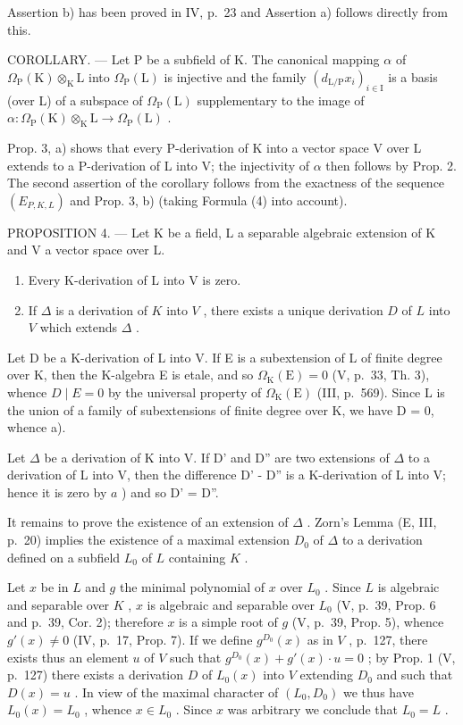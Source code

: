 Assertion b) has been proved in IV, p.~23 and Assertion a) follows directly from this.

COROLLARY. --- Let P be a subfield of K. The canonical mapping \(\alpha\) of \(\Omega_{\mathrm{P}}(\mathrm{K}) \otimes_{\mathrm{K}} \mathrm{L}\) into \(\Omega_{\mathrm{P}}(\mathrm{L})\) is injective and the family \((d_{\mathrm{L}/\mathrm{P}}x_{i})_{i \in \mathrm{I}}\) is a basis (over L) of a subspace of \(\Omega_{\mathrm{P}}(\mathrm{L})\) supplementary to the image of \(\alpha: \Omega_{\mathrm{P}}(\mathrm{K}) \otimes_{\mathrm{K}} \mathrm{L} \to \Omega_{\mathrm{P}}(\mathrm{L})\) .

Prop. 3, a) shows that every P-derivation of K into a vector space V over L extends to a P-derivation of L into V; the injectivity of \(\alpha\) then follows by Prop. 2. The second assertion of the corollary follows from the exactness of the sequence \((E_{P,K,L})\) and Prop. 3, b) (taking Formula (4) into account).

PROPOSITION 4. --- Let K be a field, L a separable algebraic extension of K and V a vector space over L.

\begin{enumerate}
\def\labelenumi{\alph{enumi})}
\item
  Every K-derivation of L into V is zero.
\item
  If \(\Delta\) is a derivation of \(K\) into \(V\) , there exists a unique derivation \(D\) of \(L\) into \(V\) which extends \(\Delta\) .
\end{enumerate}

Let D be a K-derivation of L into V. If E is a subextension of L of finite degree over K, then the K-algebra E is etale, and so \(\Omega_{\mathrm{K}}(\mathrm{E}) = 0\) (V, p.~33, Th. 3), whence \(D \mid E = 0\) by the universal property of \(\Omega_{\mathrm{K}}(\mathrm{E})\) (III, p.~569). Since L is the union of a family of subextensions of finite degree over K, we have D = 0, whence a).

Let \(\Delta\) be a derivation of K into V. If D' and D'' are two extensions of \(\Delta\) to a derivation of L into V, then the difference D' - D'' is a K-derivation of L into V; hence it is zero by \(a\) ) and so D' = D''.

It remains to prove the existence of an extension of \(\Delta\) . Zorn's Lemma (E, III, p.~20) implies the existence of a maximal extension \(D_0\) of \(\Delta\) to a derivation defined on a subfield \(L_0\) of \(L\) containing \(K\) .

Let \(x\) be in \(L\) and \(g\) the minimal polynomial of \(x\) over \(L_0\) . Since \(L\) is algebraic and separable over \(K\) , \(x\) is algebraic and separable over \(L_0\) (V, p.~39, Prop. 6 and p.~39, Cor. 2); therefore \(x\) is a simple root of \(g\) (V, p.~39, Prop. 5), whence \(g'(x) \neq 0\) (IV, p.~17, Prop. 7). If we define \(g^{D_0}(x)\) as in \(V\) , p.~127, there exists thus an element \(u\) of \(V\) such that \(g^{D_0}(x) + g'(x) \cdot u = 0\) ; by Prop. 1 (V, p.~127) there exists a derivation \(D\) of \(L_0(x)\) into \(V\) extending \(D_0\) and such that \(D(x) = u\) . In view of the maximal character of \((L_0, D_0)\) we thus have \(L_0(x) = L_0\) , whence \(x \in L_0\) . Since \(x\) was arbitrary we conclude that \(L_0 = L\) .

